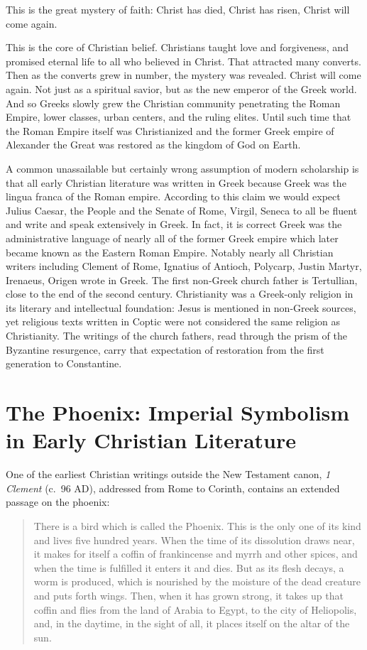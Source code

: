 This is the great mystery of faith:
Christ has died, Christ has risen, Christ will come again.

This is the core of Christian belief.
Christians taught love and forgiveness, and promised eternal life to all who believed in Christ.
That attracted many converts.
Then as the converts grew in number, the mystery was revealed.
Christ will come again.
Not just as a spiritual savior, but as the new emperor of the Greek world.
And so Greeks slowly grew the Christian community penetrating the Roman Empire, lower classes, urban centers, and the ruling elites.
Until such time that the Roman Empire itself was Christianized and the former Greek empire of Alexander the Great was restored as the kingdom of God on Earth.

A common unassailable but certainly wrong assumption of modern scholarship is that all early Christian literature was written in Greek because Greek was the lingua franca of the Roman empire.
According to this claim we would expect Julius Caesar, the People and the Senate of Rome, Virgil, Seneca to all be fluent and write and speak extensively in Greek.
In fact, it is correct Greek was the administrative language of nearly all of the former Greek empire which later became known as the Eastern Roman Empire.
Notably nearly all Christian writers including Clement of Rome, Ignatius of Antioch, Polycarp, Justin Martyr, Irenaeus, Origen wrote in Greek.
The first non-Greek church father is Tertullian, close to the end of the second century.
Christianity was a Greek-only religion in its literary and intellectual foundation: Jesus is mentioned in non-Greek sources, yet religious texts written in Coptic were not considered the same religion as Christianity.
The writings of the church fathers, read through the prism of the Byzantine resurgence, carry that expectation of restoration from the first generation to Constantine.

\section{The Phoenix: Imperial Symbolism in Early Christian Literature}\label{sec:phoenix-symbolism}

One of the earliest Christian writings outside the New Testament canon, \emph{1 Clement} (c.~96 AD), addressed from Rome to Corinth, contains an extended passage on the phoenix:

\begin{quote}
There is a bird which is called the Phoenix.
This is the only one of its kind and lives five hundred years.
When the time of its dissolution draws near, it makes for itself a coffin of frankincense and myrrh and other spices, and when the time is fulfilled it enters it and dies.
But as its flesh decays, a worm is produced, which is nourished by the moisture of the dead creature and puts forth wings.
Then, when it has grown strong, it takes up that coffin and flies from the land of Arabia to Egypt, to the city of Heliopolis, and, in the daytime, in the sight of all, it places itself on the altar of the sun.
\cite[25:1--5]{clement:firstclement}
\end{quote}

